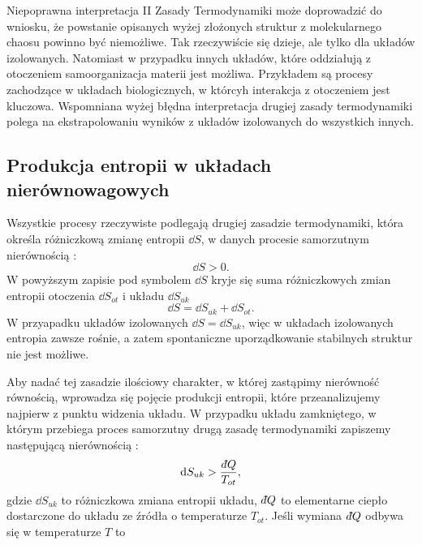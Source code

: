 \documentclass[10pt, a4paper, twoside, onecolumn]{article}
\numberwithin{equation}{section}
\newcommand{\dbar}{d\hspace*{-0.08em}\bar{}\hspace*{0.1em}}
\begin{document}
	Niepoprawna interpretacja II Zasady Termodynamiki może doprowadzić do wniosku, że powstanie opisanych wyżej złożonych struktur z molekularnego chaosu powinno być niemożliwe. Tak rzeczywiście się dzieje, ale tylko dla układów izolowanych. Natomiast w przypadku innych układów, które oddziałują z otoczeniem samoorganizacja materii jest możliwa. Przykładem są procesy zachodzące w układach biologicznych, w którcyh interakcja z otoczeniem jest kluczowa. %
	Wspomniana wyżej błędna interpretacja drugiej zasady termodynamiki polega na ekstrapolowaniu wyników z układów izolowanych do wszystkich innych.
	
	\subsection{Produkcja entropii w układach nierównowagowych}
	Wszystkie procesy rzeczywiste podlegają drugiej zasadzie termodynamiki, która określa różniczkową zmianę entropii \(\dd{S}\), w danych procesie samorzutnym nierównością \cite{buchowski}:
	\begin{equation}\label{II_Zasada_Termodynamiki}
		\dd{S}>0.
	\end{equation}
	W powyższym zapisie pod symbolem \(\dd{S}\) kryje się suma różniczkowych zmian entropii otoczenia \(\dd{S_{ot}}\) i układu \(\dd{S_{uk}}\)
	\begin{equation}\label{entropia_uklad_otoczenie}
		\dd{S}=\dd{S_{uk}}+\dd{S_{ot}}.
	\end{equation}
	W przyapadku układów izolowanych \(\dd{S}=\dd{S_{uk}}\), 
	więc w układach izolowanych entropia zawsze rośnie, a zatem spontaniczne uporządkowanie stabilnych struktur nie jest możliwe. \par
	Aby nadać tej zasadzie ilościowy charakter, w której zastąpimy nierówność równością, wprowadza się pojęcie produkcji entropii, które przeanalizujemy najpierw z punktu widzenia układu. W przypadku układu zamkniętego, w którym przebiega proces samorzutny drugą zasadę termodynamiki zapiszemy następującą nierównością \cite{orlik, pigon1, jaworski}: 
	\begin{equation}\label{II_Zasada_Termodynamiki_uklad}
		\dd{S_{uk}}>\frac{\dbar Q}{T_{ot}},
	\end{equation}
	gdzie \(\dd{S_{uk}}\) to różniczkowa zmiana entropii układu, \(\dbar Q\) to elementarne ciepło dostarczone do układu ze źródła o temperaturze \(T_{ot}\). Jeśli wymiana \(\dbar Q\) odbywa się w temperaturze \(T\) to 
\end{document}
